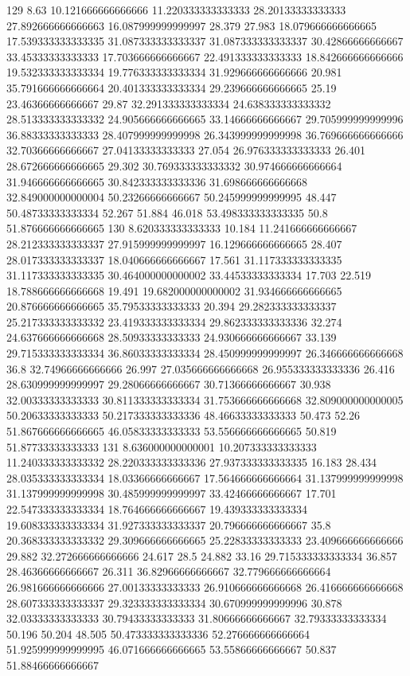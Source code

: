 129 8.63 10.121666666666666 11.220333333333333 28.20133333333333 27.892666666666663 16.087999999999997 28.379 27.983 18.079666666666665 17.539333333333335 31.087333333333337 31.087333333333337 30.42866666666667 33.45333333333333 17.703666666666667 22.491333333333333 18.842666666666666 19.532333333333334 19.776333333333334 31.929666666666666 20.981 35.791666666666664 20.401333333333334 29.239666666666665 25.19 23.46366666666667 29.87 32.291333333333334 24.638333333333332 28.513333333333332 24.905666666666665 33.14666666666667 29.705999999999996 36.88333333333333 28.407999999999998 26.343999999999998 36.769666666666666 32.70366666666667 27.04133333333333 27.054 26.976333333333333 26.401 28.672666666666665 29.302 30.769333333333332 30.974666666666664 31.946666666666665 30.842333333333336 31.698666666666668 32.849000000000004 50.23266666666667 50.245999999999995 48.447 50.48733333333334 52.267 51.884 46.018 53.498333333333335 50.8 51.876666666666665
130 8.620333333333333 10.184 11.241666666666667 28.212333333333337 27.915999999999997 16.129666666666665 28.407 28.017333333333337 18.040666666666667 17.561 31.117333333333335 31.117333333333335 30.464000000000002 33.44533333333334 17.703 22.519 18.788666666666668 19.491 19.682000000000002 31.934666666666665 20.876666666666665 35.79533333333333 20.394 29.282333333333337 25.217333333333332 23.419333333333334 29.862333333333336 32.274 24.637666666666668 28.50933333333333 24.930666666666667 33.139 29.715333333333334 36.86033333333334 28.450999999999997 26.346666666666668 36.8 32.74966666666666 26.997 27.035666666666668 26.955333333333336 26.416 28.630999999999997 29.28066666666667 30.71366666666667 30.938 32.00333333333333 30.811333333333334 31.753666666666668 32.809000000000005 50.20633333333333 50.217333333333336 48.46633333333333 50.473 52.26 51.867666666666665 46.05833333333333 53.556666666666665 50.819 51.87733333333333
131 8.636000000000001 10.207333333333333 11.240333333333332 28.220333333333336 27.937333333333335 16.183 28.434 28.035333333333334 18.03366666666667 17.564666666666664 31.137999999999998 31.137999999999998 30.485999999999997 33.42466666666667 17.701 22.547333333333334 18.764666666666667 19.439333333333334 19.608333333333334 31.927333333333337 20.796666666666667 35.8 20.368333333333332 29.309666666666665 25.22833333333333 23.409666666666666 29.882 32.272666666666666 24.617 28.5 24.882 33.16 29.715333333333334 36.857 28.46366666666667 26.311 36.82966666666667 32.779666666666664 26.981666666666666 27.00133333333333 26.910666666666668 26.416666666666668 28.607333333333337 29.323333333333334 30.670999999999996 30.878 32.03333333333333 30.79433333333333 31.80666666666667 32.79333333333334 50.196 50.204 48.505 50.473333333333336 52.276666666666664 51.925999999999995 46.071666666666665 53.55866666666667 50.837 51.88466666666667
